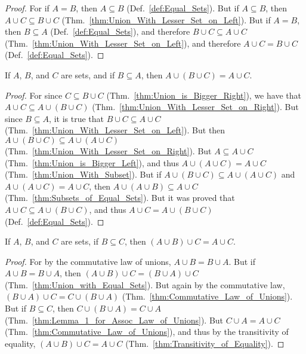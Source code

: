         \begin{proof}
            For if $A=B$, then $A\subseteq{B}$ (Def.~\ref{def:Equal_Sets}). But
            if $A\subseteq{B}$, then $A\cup{C}\subseteq{B}\cup{C}$
            (Thm.~\ref{thm:Union_With_Lesser_Set_on_Left}). But if $A=B$, then
            $B\subseteq{A}$ (Def.~\ref{def:Equal_Sets}), and therefore
            $B\cup{C}\subseteq{A}\cup{C}$
            (Thm.~\ref{thm:Union_With_Lesser_Set_on_Left}), and therefore
            $A\cup{C}=B\cup{C}$ (Def.~\ref{def:Equal_Sets}).
        \end{proof}
        \begin{theorem}
            \label{thm:Lemma_1_for_Assoc_Law_of_Unions}%
            If $A$, $B$, and $C$ are sets, and if $B\subseteq{A}$, then
            $A\cup(B\cup{C})=A\cup{C}$.
        \end{theorem}
        \begin{proof}
            For since $C\subseteq{B}\cup{C}$
            (Thm.~\ref{thm:Union_is_Bigger_Right}), we have that
            $A\cup{C}\subseteq{A}\cup(B\cup{C})$
            (Thm.~\ref{thm:Union_With_Lesser_Set_on_Right}). But since
            $B\subseteq{A}$, it is true that $B\cup{C}\subseteq{A}\cup{C}$
            (Thm.~\ref{thm:Union_With_Lesser_Set_on_Left}). But then
            $A\cup(B\cup{C})\subseteq{A}\cup(A\cup{C})$
            (Thm.~\ref{thm:Union_With_Lesser_Set_on_Right}). But
            $A\subseteq{A}\cup{C}$ (Thm.~\ref{thm:Union_is_Bigger_Left}), and
            thus $A\cup(A\cup{C})=A\cup{C}$ (Thm.~\ref{thm:Union_With_Subset}).
            But if $A\cup(B\cup{C})\subseteq{A}\cup(A\cup{C})$ and
            $A\cup(A\cup{C})=A\cup{C}$, then
            $A\cup(A\cup{B})\subseteq{A}\cup{C}$
            (Thm.~\ref{thm:Subsets_of_Equal_Sets}). But it was proved that
            $A\cup{C}\subseteq{A}\cup(B\cup{C})$, and thus
            $A\cup{C}=A\cup(B\cup{C})$ (Def.~\ref{def:Equal_Sets}).
        \end{proof}
        \begin{theorem}
            \label{thm:Lemma_2_for_Assoc_Law_of_Unions}%
            If $A$, $B$, and $C$ are sets, if $B\subseteq{C}$, then
            $(A\cup{B})\cup{C}=A\cup{C}$.
        \end{theorem}
        \begin{proof}
            For by the commutative law of unions,
            $A\cup{B}=B\cup{A}$. But if $A\cup{B}=B\cup{A}$, then
            $(A\cup{B})\cup{C}=(B\cup{A})\cup{C}$
            (Thm.~\ref{thm:Union_with_Equal_Sets}). But again by the commutative
            law, $(B\cup{A})\cup{C}=C\cup(B\cup{A})$
            (Thm.~\ref{thm:Commutative_Law_of_Unions}). But if
            $B\subseteq{C}$, then $C\cup(B\cup{A})=C\cup{A}$
            (Thm.~\ref{thm:Lemma_1_for_Assoc_Law_of_Unions}). But
            $C\cup{A}=A\cup{C}$ (Thm.~\ref{thm:Commutative_Law_of_Unions}),
            and thus by the transitivity of equality,
            $(A\cup{B})\cup{C}=A\cup{C}$
            (Thm.~\ref{thm:Transitivity_of_Equality}).
        \end{proof}
